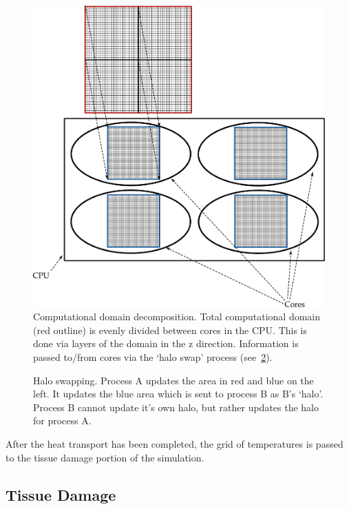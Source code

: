 \begin{figure}
\vspace{-45pt}
\centering
\includegraphics[scale=.35]{./ablation/images/grid-decomp.pdf}
\caption{Computational domain decomposition. Total computational domain (red outline) is evenly divided between cores in the CPU. This is done via layers of the domain in the z direction. Information is passed to/from cores via the `halo swap' process (see~\cref{fig:haloswap}).}
\label{fig:griddecomp}
\vspace{-10pt}
\end{figure}

\begin{figure}
\centering
\def\svgwidth{350pt}

\caption{Halo swapping. Process A updates the area in red and blue on the left. It updates the blue area which is sent to process B as B's `halo'. Process B cannot update it's own halo, but rather updates the halo for process A.}
\label{fig:haloswap}
\end{figure}


After the heat transport has been completed, the grid of temperatures is passed to the tissue damage portion of the simulation.

\subsection{Tissue Damage}
\label{sec:tissuedamage}


